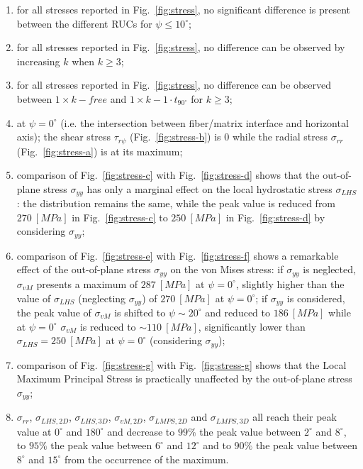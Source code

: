 \documentclass[12pt,a4paper]{article}
\begin{document}
\begin{enumerate}
\itemsep-0.5pt
\item for all stresses reported in Fig.~\ref{fig:stress}, no significant difference is present between the different RUCs for $\psi\leq10^{\circ}$;
\item for all stresses reported in Fig.~\ref{fig:stress}, no difference can be observed by increasing $k$ when $k\geq3$;
\item for all stresses reported in Fig.~\ref{fig:stress}, no difference can be observed between $1\times  k-free$ and $1\times  k-1\cdot t_{90^{\circ}}$ for $k\geq3$;
\item at $\psi=0^{\circ}$ (i.e. the intersection between fiber/matrix interface and horizontal axis); the shear stress $\tau_{r\psi}$ (Fig.~\ref{fig:stress-b}) is $0$ while the radial stress $\sigma_{rr}$ (Fig.~\ref{fig:stress-a}) is at its maximum;
\item comparison of Fig.~\ref{fig:stress-c} with Fig.~\ref{fig:stress-d} shows that the out-of-plane stress $\sigma_{yy}$ has only a marginal effect on the local hydrostatic stress $\sigma_{LHS}$: the distribution remains the same, while the peak value is reduced from $270\ \left[MPa\right]$ in Fig.~\ref{fig:stress-c} to $250\ \left[MPa\right]$ in Fig.~\ref{fig:stress-d} by considering $\sigma_{yy}$;
\item comparison of Fig.~\ref{fig:stress-e} with Fig.~\ref{fig:stress-f} shows a remarkable effect of the out-of-plane stress $\sigma_{yy}$ on the von Mises stress: if $\sigma_{yy}$ is neglected, $\sigma_{vM}$ presents a maximum of $287\ \left[MPa\right]$ at $\psi=0^{\circ}$, slightly higher than the value of $\sigma_{LHS}$ (neglecting $\sigma_{yy}$) of $270\ \left[MPa\right]$ at $\psi=0^{\circ}$; if $\sigma_{yy}$ is considered, the peak value of $\sigma_{vM}$ is shifted to $\psi\sim20^{\circ}$ and reduced to $186\ \left[MPa\right]$ while at $\psi=0^{\circ}$ $\sigma_{vM}$ is reduced to $\sim110\ \left[MPa\right]$, significantly lower than $\sigma_{LHS}=250\ \left[MPa\right]$ at $\psi=0^{\circ}$ (considering $\sigma_{yy}$);
\item comparison of Fig.~\ref{fig:stress-g} with Fig.~\ref{fig:stress-g} shows that the Local Maximum Principal Stress is practically unaffected by the out-of-plane stress $\sigma_{yy}$;
\item $\sigma_{rr}$, $\sigma_{LHS,2D}$, $\sigma_{LHS,3D}$, $\sigma_{vM,2D}$, $\sigma_{LMPS,2D}$ and $\sigma_{LMPS,3D}$ all reach their peak value at $0^{\circ}$ and $180^{\circ}$ and decrease to $99\%$ the peak value between $2^{\circ}$ and $8^{\circ}$, to $95\%$ the peak value between $6^{\circ}$ and $12^{\circ}$ and to $90\%$ the peak value between $8^{\circ}$ and $15^{\circ}$ from the occurrence of the maximum.
\end{enumerate}
\end{document}

